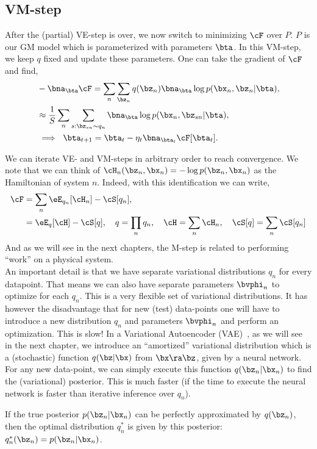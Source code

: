 \documentclass{lecture}
\begin{document}
\subsection{VM-step}
After the (partial) VE-step is over, we now switch to minimizing $\cF$ over $P$. $P$ is our GM model which is parameterized with parameters $\bta$. In this VM-step, we keep $q$ fixed and update these parameters. One can take the gradient of $\cF$ and find,
\begin{align}
	 &-\bna_\bta\cF = \sum_n\sum_{\bz_n} q(\bz_n) \bna_{\bta}\log p(\bx_n,\bz_n|\bta),\\
	 &\approx \frac{1}{S}\sum_n\sum_{s:\bz_{sn}\sim q_n}\bna_{\bta}\log p(\bx_n,\bz_{sn}|\bta),\\
	 &\implies~\bta_{t+1} = \bta_t - \eta_t \bna_{\bta_t}\cF[\bta_t]. \label{eqn:M-step}
\end{align}

We can iterate VE- and VM-steps in arbitrary order to reach convergence. We note that we can think of $\cH_n(\bz_n,\bx_n) = -\log p(\bz_n,\bx_n)$ as the Hamiltonian of system $n$. Indeed, with this identification we can write,
\begin{align}
	\cF &= \sum_n \eE_{q_n}[\cH_n] -\cS[q_n],\\
	    &=\eE_{q}[\cH] - \cS[q],~~~q = \prod_n q_n,~~~\cH=\sum_n \cH_n,~~~\cS[q]=\sum_n\cS[q_n]
\end{align}
And as we will see in the next chapters, the M-step is related to performing ``work'' on a physical system.\\

An important detail is that we have separate variational distributions $q_n$ for every datapoint. That means we can also have separate parameters $\bvphi_n$ to optimize for each $q_n$. This is a very flexible set of variational distributions. It has however the disadvantage that for new (test) data-points one will have to introduce a new distribution $q_n$ and parameters $\bvphi_n$ and perform an optimization. This is slow! In a Variational Autoencoder (VAE)~\cite{Kingma2014Autoencoding}, as we will see in the next chapter, we introduce an ``amortized'' variational distribution which is a (stochastic) function $q(\bz|\bx)$ from $\bx\ra\bz$, given by a neural network. For any new data-point, we can simply execute this function $q(\bz_n|\bx_n)$ to find the (variational) posterior. This is much faster (if the time to execute the neural network is faster than iterative inference over $q_n$).

If the true posterior $p(\bz_n|\bx_n)$ can be perfectly approximated by $q(\bz_n)$, then the optimal distribution $q_n^*$ is given by this posterior: $q_n^*(\bz_n)=p(\bz_n|\bx_n)$.
\end{document}
